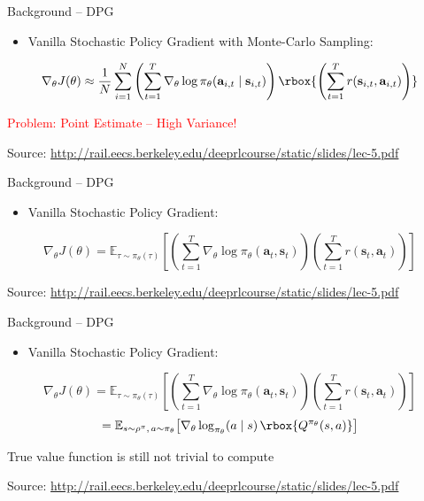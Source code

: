\begin{frame}{Background -- DPG}
\begin{itemize}
    \item Vanilla Stochastic Policy Gradient with Monte-Carlo Sampling:
\end{itemize}
\[
\nabla_\theta J(\theta) \approx \frac{1}{N} \sum_{i=1}^{N} \left( \sum_{t=1}^{T} \nabla_\theta \log \pi_\theta(\mathbf{a}_{i,t} \mid \mathbf{s}_{i,t}) \right) \rbox{\left( \sum_{t=1}^{T} r(\mathbf{s}_{i,t}, \mathbf{a}_{i,t}) \right)}
\]
\vspace{1em}

\textcolor{red}{Problem: Point Estimate -- High Variance!}
\vfill
\begin{flushright}
    \tiny Source: \url{http://rail.eecs.berkeley.edu/deeprlcourse/static/slides/lec-5.pdf}
\end{flushright}
\end{frame}
\begin{frame}{Background -- DPG}
\begin{itemize}
    \item Vanilla Stochastic Policy Gradient:
\end{itemize}
\[
\nabla_\theta J(\theta) = \mathbb{E}_{\tau \sim \pi_\theta(\tau)}\!\left[ \left( \sum_{t=1}^{T} \nabla_\theta \log \pi_\theta(\mathbf{a}_t, \mathbf{s}_t) \right) \left( \sum_{t=1}^{T} r(\mathbf{s}_t, \mathbf{a}_t) \right) \right]
\]
\vfill
\begin{flushright}
    \tiny Source: \url{http://rail.eecs.berkeley.edu/deeprlcourse/static/slides/lec-5.pdf}
\end{flushright}
\end{frame}

\begin{frame}{Background -- DPG}
\begin{itemize}
    \item Vanilla Stochastic Policy Gradient:
\end{itemize}
\[
\nabla_\theta J(\theta) = \mathbb{E}_{\tau \sim \pi_\theta(\tau)}\!\left[ \left( \sum_{t=1}^{T} \nabla_\theta \log \pi_\theta(\mathbf{a}_t, \mathbf{s}_t) \right) \left( \sum_{t=1}^{T} r(\mathbf{s}_t, \mathbf{a}_t) \right) \right]
\]
\[
= \mathbb{E}_{s \sim \rho^\pi,\, a \sim \pi_\theta}\!\left[ \nabla_\theta \log_{\pi_\theta}(a \mid s)\, \rbox{Q^{\pi_\theta}(s, a)} \right]
\]
\vspace{0.5em}

True value function is still not trivial to compute
\vfill
\begin{flushright}
    \tiny Source: \url{http://rail.eecs.berkeley.edu/deeprlcourse/static/slides/lec-5.pdf}
\end{flushright}
\end{frame}

